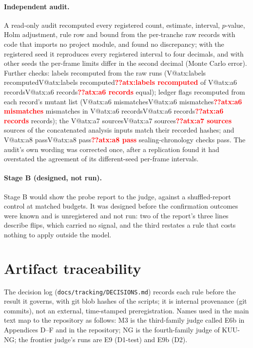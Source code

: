 \documentclass[pdflatex,iicol,sn-mathphys-num]{sn-jnl}
\makeatletter
\newcommand{\V}[1]{\ifcsname V@#1\endcsname\csname V@#1\endcsname\else\textbf{\textcolor{red}{??#1}}\fi}
\makeatother
\begin{document}
\begin{appendices}
\paragraph{Independent audit.} A read-only audit recomputed every registered count, estimate, interval, $p$-value, Holm adjustment, rule row and bound from the per-tranche raw records with code that imports no project module, and found no discrepancy; with the registered seed it reproduces every registered interval to four decimals, and with other seeds the per-frame limits differ in the second decimal (Monte Carlo error). Further checks: labels recomputed from the raw runs (\V{atx:labels recomputed} of \V{atx:a6 records} equal); ledger flags recomputed from each record's mutant list (\V{atx:a6 mismatches} mismatches in \V{atx:a6 records} records); the \V{atx:a7 sources} sources of the concatenated analysis inputs match their recorded hashes; and \V{atx:a8 pass} sealing-chronology checks pass. The audit's own wording was corrected once, after a replication found it had overstated the agreement of its different-seed per-frame intervals.

\paragraph{Stage B (designed, not run).} Stage B would show the probe report to the judge, against a shuffled-report control at matched budgets. It was designed before the confirmation outcomes were known and is unregistered and not run: two of the report's three lines describe flips, which carried no signal, and the third restates a rule that costs nothing to apply outside the model.

\section{Artifact traceability}\label{app:trace}
\setcounter{table}{0}\setcounter{figure}{0}%

\noindent The decision log (\texttt{docs/tracking/DECISIONS.md}) records each rule before the result it governs, with git blob hashes of the scripts; it is internal provenance (git commits), not an external, time-stamped preregistration. Names used in the main text map to the repository as follows: M3 is the third-family judge called E6b in Appendices D--F and in the repository; NG is the fourth-family judge of KUU-NG; the frontier judge's runs are E9 (D1-test) and E9b (D2).


\end{appendices}
\end{document}
